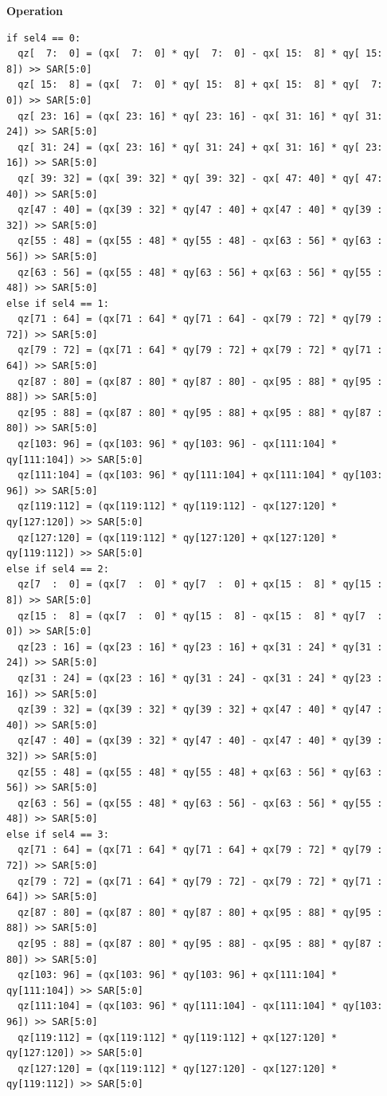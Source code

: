 \textbf{Operation}\\
\begin{lstlisting}
if sel4 == 0:
  qz[  7:  0] = (qx[  7:  0] * qy[  7:  0] - qx[ 15:  8] * qy[ 15:  8]) >> SAR[5:0]
  qz[ 15:  8] = (qx[  7:  0] * qy[ 15:  8] + qx[ 15:  8] * qy[  7:  0]) >> SAR[5:0]
  qz[ 23: 16] = (qx[ 23: 16] * qy[ 23: 16] - qx[ 31: 16] * qy[ 31: 24]) >> SAR[5:0]
  qz[ 31: 24] = (qx[ 23: 16] * qy[ 31: 24] + qx[ 31: 16] * qy[ 23: 16]) >> SAR[5:0]
  qz[ 39: 32] = (qx[ 39: 32] * qy[ 39: 32] - qx[ 47: 40] * qy[ 47: 40]) >> SAR[5:0]
  qz[47 : 40] = (qx[39 : 32] * qy[47 : 40] + qx[47 : 40] * qy[39 : 32]) >> SAR[5:0]
  qz[55 : 48] = (qx[55 : 48] * qy[55 : 48] - qx[63 : 56] * qy[63 : 56]) >> SAR[5:0]
  qz[63 : 56] = (qx[55 : 48] * qy[63 : 56] + qx[63 : 56] * qy[55 : 48]) >> SAR[5:0]
else if sel4 == 1:
  qz[71 : 64] = (qx[71 : 64] * qy[71 : 64] - qx[79 : 72] * qy[79 : 72]) >> SAR[5:0]
  qz[79 : 72] = (qx[71 : 64] * qy[79 : 72] + qx[79 : 72] * qy[71 : 64]) >> SAR[5:0]
  qz[87 : 80] = (qx[87 : 80] * qy[87 : 80] - qx[95 : 88] * qy[95 : 88]) >> SAR[5:0]
  qz[95 : 88] = (qx[87 : 80] * qy[95 : 88] + qx[95 : 88] * qy[87 : 80]) >> SAR[5:0]
  qz[103: 96] = (qx[103: 96] * qy[103: 96] - qx[111:104] * qy[111:104]) >> SAR[5:0]
  qz[111:104] = (qx[103: 96] * qy[111:104] + qx[111:104] * qy[103: 96]) >> SAR[5:0]
  qz[119:112] = (qx[119:112] * qy[119:112] - qx[127:120] * qy[127:120]) >> SAR[5:0]
  qz[127:120] = (qx[119:112] * qy[127:120] + qx[127:120] * qy[119:112]) >> SAR[5:0]
else if sel4 == 2:
  qz[7  :  0] = (qx[7  :  0] * qy[7  :  0] + qx[15 :  8] * qy[15 :  8]) >> SAR[5:0]
  qz[15 :  8] = (qx[7  :  0] * qy[15 :  8] - qx[15 :  8] * qy[7  :  0]) >> SAR[5:0]
  qz[23 : 16] = (qx[23 : 16] * qy[23 : 16] + qx[31 : 24] * qy[31 : 24]) >> SAR[5:0]
  qz[31 : 24] = (qx[23 : 16] * qy[31 : 24] - qx[31 : 24] * qy[23 : 16]) >> SAR[5:0]
  qz[39 : 32] = (qx[39 : 32] * qy[39 : 32] + qx[47 : 40] * qy[47 : 40]) >> SAR[5:0]
  qz[47 : 40] = (qx[39 : 32] * qy[47 : 40] - qx[47 : 40] * qy[39 : 32]) >> SAR[5:0]
  qz[55 : 48] = (qx[55 : 48] * qy[55 : 48] + qx[63 : 56] * qy[63 : 56]) >> SAR[5:0]
  qz[63 : 56] = (qx[55 : 48] * qy[63 : 56] - qx[63 : 56] * qy[55 : 48]) >> SAR[5:0]
else if sel4 == 3:
  qz[71 : 64] = (qx[71 : 64] * qy[71 : 64] + qx[79 : 72] * qy[79 : 72]) >> SAR[5:0]
  qz[79 : 72] = (qx[71 : 64] * qy[79 : 72] - qx[79 : 72] * qy[71 : 64]) >> SAR[5:0]
  qz[87 : 80] = (qx[87 : 80] * qy[87 : 80] + qx[95 : 88] * qy[95 : 88]) >> SAR[5:0]
  qz[95 : 88] = (qx[87 : 80] * qy[95 : 88] - qx[95 : 88] * qy[87 : 80]) >> SAR[5:0]
  qz[103: 96] = (qx[103: 96] * qy[103: 96] + qx[111:104] * qy[111:104]) >> SAR[5:0]
  qz[111:104] = (qx[103: 96] * qy[111:104] - qx[111:104] * qy[103: 96]) >> SAR[5:0]
  qz[119:112] = (qx[119:112] * qy[119:112] + qx[127:120] * qy[127:120]) >> SAR[5:0]
  qz[127:120] = (qx[119:112] * qy[127:120] - qx[127:120] * qy[119:112]) >> SAR[5:0]

\end{lstlisting}


